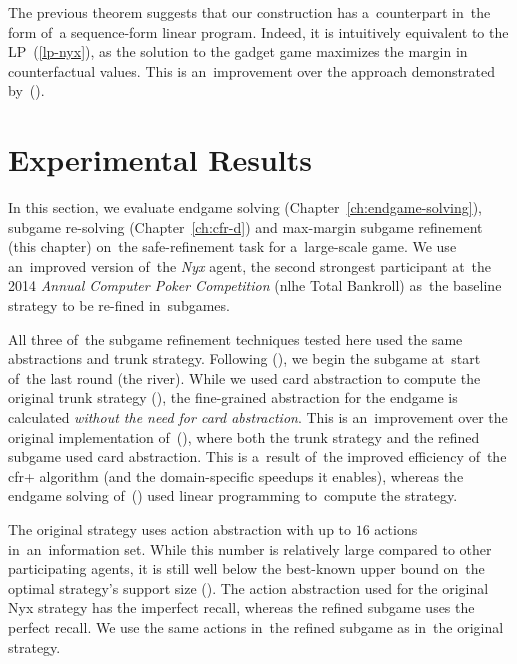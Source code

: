 The previous theorem suggests that our construction has a~counterpart in~the form of~a sequence-form linear program.
Indeed, it is intuitively equivalent to the LP~(\ref{lp-nyx}), as the solution to the gadget game maximizes the margin in counterfactual values.
This is an~improvement over the approach demonstrated by~(\cite{BurchJohansonBowling2014}).

\section{Experimental Results}
\label{sec:max-margin-experiments}
In this section, we evaluate endgame solving (Chapter~\ref{ch:endgame-solving}), subgame re-solving (Chapter~\ref{ch:cfr-d}) and max-margin subgame refinement (this chapter) on~the safe-refinement task for a~large-scale game.
We use an~improved version of~the \emph{Nyx} agent, the second strongest participant at~the 2014 \emph{Annual Computer Poker Competition} (\acrlong{nlhe} Total Bankroll)\footnotemark{} as~the baseline strategy to be re-fined in~subgames.

All three of~the subgame refinement techniques tested here used the same abstractions and trunk strategy.
Following (\cite{Ganzfried2015endgame}), we begin the subgame at~start of~the last round (the river).
While we used card abstraction to compute the original trunk strategy (\cite{Schmid2015automatic, Johanson2013evaluating}), the fine-grained abstraction for the endgame is calculated \emph{without the need for card abstraction}.
This is an~improvement over the original implementation of~(\cite{Ganzfried2015endgame}), where both the trunk strategy and the refined subgame used card abstraction.
This is a~result of~the improved efficiency of~the \acrshort{cfr}+ algorithm (and the domain-specific speedups it enables), whereas the endgame solving of~(\cite{Ganzfried2015endgame}) used linear programming to~compute the strategy.

The original strategy uses action abstraction with up to $16$ actions in~an~information set.
While this number is relatively large compared to other participating agents, it is still well below the best-known upper bound on~the optimal strategy's  support size (\cite{Schmid2014bounding}).
The action abstraction used for the original Nyx strategy has the imperfect recall, whereas the refined subgame uses the perfect recall.
We use the same actions in~the refined subgame as in~the original strategy.


